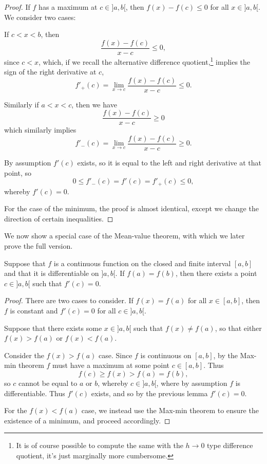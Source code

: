 \begin{proof}
	If $f$ has a maximum at $c \in {]{a, b}[}$, then $f(x) - f(c) \leq 0$ for all $x \in {]{a, b}[}$. We consider two cases:

	 If $c < x < b$, then
	\[
		\frac{f(x) - f(c)}{x - c} \leq 0,
	\]
	since $c < x$, which, if we recall the alternative difference quotient,\footnote{It is of course possible to compute the same with the $h \to 0$ type difference quotient, it's just marginally more cumbersome.} implies the sign of the right derivative at $c$,
	\[
		f'_+(c) = \lim_{x \to c} \frac{f(x) - f(c)}{x - c} \leq 0.
	\]

	\noindent
	 Similarly if $a < x < c$, then we have
	\[
		\frac{f(x) - f(c)}{x - c} \geq 0
	\]
	which similarly implies
	\[
		f'_-(c) = \lim_{x \to c} \frac{f(x) - f(c)}{x - c} \geq 0.
	\]

	\noindent
	By assumption $f'(c)$ exists, so it is equal to the left and right derivative at that point, so
	\[
		0 \leq f'_-(c) = f'(c) = f'_+(c) \leq 0,
	\]
	whereby $f'(c) = 0$.

	For the case of the minimum, the proof is almost identical, except we change the direction of certain inequalities.
\end{proof}

\noindent
We now show a special case of the Mean-value theorem, with which we later prove the full version.

\begin{theorem}
	Suppose that $f$ is a continuous function on the closed and finite interval $[a, b]$ and that it is differentiable on ${]{a, b}[}$. If $f(a) = f(b)$, then there exists a point $c \in {]{a, b}[}$ such that $f'(c) = 0$.
\end{theorem}

\begin{proof}
	There are two cases to consider. If $f(x) = f(a)$ for all $x \in [a, b]$, then $f$ is constant and $f'(c) = 0$ for all $c \in {]{a, b}[}$.

	Suppose that there exists some $x \in {]{a, b}[}$ such that $f(x) \neq f(a)$, so that either $f(x) > f(a)$ or $f(x) < f(a)$.

	Consider the $f(x) > f(a)$ case. Since $f$ is continuous on $[a, b]$, by the Max-min theorem $f$ must have a maximum at some point $c \in [a, b]$. Thus
	\[
		f(c) \geq f(x) > f(a) = f(b),
	\]
	so $c$ cannot be equal to $a$ or $b$, whereby $c \in {]{a, b}[}$, where by assumption $f$ is differentiable. Thus $f'(c)$ exists, and so by the previous lemma $f'(c) = 0$.

	For the $f(x) < f(a)$ case, we instead use the Max-min theorem to ensure the existence of a minimum, and proceed accordingly.
\end{proof}

